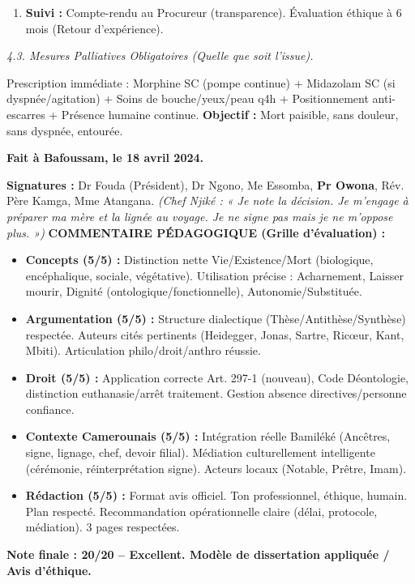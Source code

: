 \documentclass[11pt]{article}
\begin{document}
\begin{exoresolu}
\begin{enumerate}
    \item \textbf{Suivi :} Compte-rendu au Procureur (transparence). Évaluation éthique à 6 mois (Retour d'expérience).
\end{enumerate}
\emph{4.3. Mesures Palliatives Obligatoires (Quelle que soit l'issue).}\par
Prescription immédiate : Morphine SC (pompe continue) + Midazolam SC (si dyspnée/agitation) + Soins de bouche/yeux/peau q4h + Positionnement anti-escarres + Présence humaine continue. \textbf{Objectif :} Mort paisible, sans douleur, sans dyspnée, entourée.\par
\vspace{0.5cm}

\noindent\textbf{Fait à Bafoussam, le 18 avril 2024.}\par
\noindent\textbf{Signatures :} Dr Fouda (Président), Dr Ngono, Me Essomba, \textbf{Pr Owona}, Rév. Père Kamga, Mme Atangana. \textit{(Chef Njiké : « Je note la décision. Je m'engage à préparer ma mère et la lignée au voyage. Je ne signe pas mais je ne m'oppose plus. »)}
\tcblower
\textbf{COMMENTAIRE PÉDAGOGIQUE (Grille d'évaluation) :}\par
\begin{itemize}
    \item \textbf{Concepts (5/5) :} Distinction nette Vie/Existence/Mort (biologique, encéphalique, sociale, végétative). Utilisation précise : Acharnement, Laisser mourir, Dignité (ontologique/fonctionnelle), Autonomie/Substituée.
    \item \textbf{Argumentation (5/5) :} Structure dialectique (Thèse/Antithèse/Synthèse) respectée. Auteurs cités pertinents (Heidegger, Jonas, Sartre, Ricœur, Kant, Mbiti). Articulation philo/droit/anthro réussie.
    \item \textbf{Droit (5/5) :} Application correcte Art. 297-1 (nouveau), Code Déontologie, distinction euthanasie/arrêt traitement. Gestion absence directives/personne confiance.
    \item \textbf{Contexte Camerounais (5/5) :} Intégration réelle Bamiléké (Ancêtres, signe, lignage, chef, devoir filial). Médiation culturellement intelligente (cérémonie, réinterprétation signe). Acteurs locaux (Notable, Prêtre, Imam).
    \item \textbf{Rédaction (5/5) :} Format avis officiel. Ton professionnel, éthique, humain. Plan respecté. Recommandation opérationnelle claire (délai, protocole, médiation). 3 pages respectées.
\end{itemize}
\textbf{Note finale : 20/20 – Excellent. Modèle de dissertation appliquée / Avis d'éthique.}
\end{exoresolu}
\end{document}
